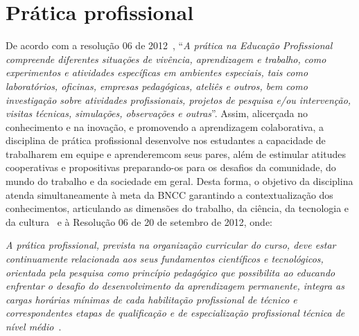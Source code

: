 \documentclass[11pt,fleqn]{book} %
\renewenvironment{quote}
{\small\list{}{\rightmargin=.1cm \leftmargin=2.5cm}%
	\item\relax}
{\endlist}
\begin{document}
\newpage
\section{Prática profissional}\label{ementasEstudo}
\indent

De acordo com a resolução 06 de 2012~\cite{Resolucao06De2012}, ``\textit{A prática na Educação Profissional compreende diferentes situações de vivência, aprendizagem e trabalho, como experimentos e atividades específicas em ambientes especiais, tais como laboratórios, oficinas, empresas pedagógicas, ateliês e outros, bem como investigação sobre atividades profissionais, projetos de pesquisa e/ou intervenção, visitas técnicas, simulações, observações e outras}''.
Assim, alicerçada no conhecimento e na inovação, e promovendo a aprendizagem colaborativa, a disciplina de prática profissional desenvolve nos estudantes a capacidade de trabalharem em equipe e aprenderemcom seus pares, além de estimular atitudes cooperativas e propositivas preparando-os para os desafios da comunidade, do mundo do trabalho e da sociedade em geral.
Desta forma, o objetivo da disciplina atenda simultaneamente à meta da BNCC garantindo a contextualização dos conhecimentos, articulando as dimensões do trabalho, da ciência, da tecnologia e da cultura~\cite{BNCC2019} e à Resolução 06 de 20 de setembro de 2012, onde:
\begin{quote}
	\textit{A prática profissional, prevista na organização curricular do curso, deve estar continuamente relacionada aos seus fundamentos científicos e tecnológicos, orientada pela pesquisa como princípio pedagógico que possibilita ao educando enfrentar o desafio do desenvolvimento da aprendizagem permanente, integra as cargas horárias mínimas de cada habilitação profissional de técnico e correspondentes etapas de qualificação e de especialização profissional técnica de nível médio}~\cite{Resolucao06De2012}.
\end{quote}
\end{document}
